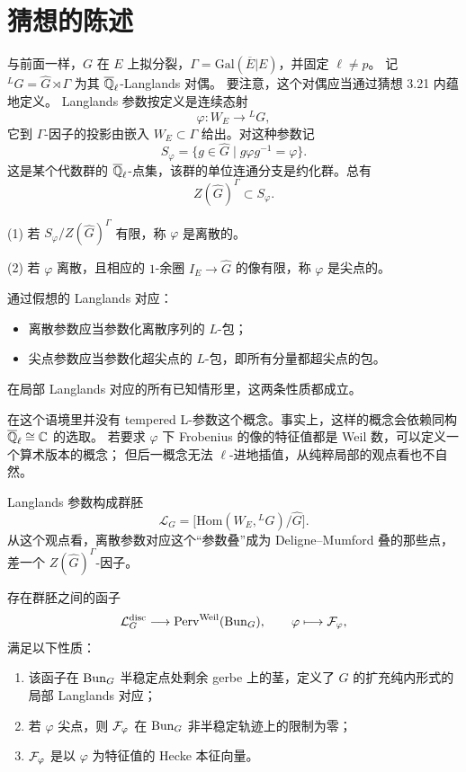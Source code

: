 \section{猜想的陈述}%

与前面一样，$G$ 在 $E$ 上拟分裂，$\Gamma=\mathrm{Gal}(\overline{E}|E)$，并固定 $\ell\neq p$。
记 ${}^{L}G=\widehat{G}\rtimes\Gamma$ 为其 $\overline{\mathbb{Q}}_\ell$-Langlands 对偶。
要注意，这个对偶应当通过猜想 3.21 内蕴地定义。
Langlands 参数按定义是连续态射
\[
\varphi:W_E\longrightarrow{}^{L}G,
\]
它到 $\Gamma$-因子的投影由嵌入 $W_E\subset\Gamma$ 给出。对这种参数记
\[
S_\varphi=\{g\in\widehat{G}\mid g\varphi g^{-1}=\varphi\}.
\]
这是某个代数群的 $\overline{\mathbb{Q}}_\ell$-点集，该群的单位连通分支是约化群。总有
\[
Z(\widehat{G})^\Gamma\subset S_\varphi.
\]

\begin{definition}\label{def:4.1}
(1) 若 $S_\varphi/Z(\widehat{G})^\Gamma$ 有限，称 $\varphi$ 是离散的。

(2) 若 $\varphi$ 离散，且相应的 $1$-余圈 $I_E\to\widehat{G}$ 的像有限，称 $\varphi$ 是尖点的。
\end{definition}

通过假想的 Langlands 对应：
\begin{itemize}
\item 离散参数应当参数化离散序列的 $L$-包；
\item 尖点参数应当参数化超尖点的 $L$-包，即所有分量都超尖点的包。
\end{itemize}
在局部 Langlands 对应的所有已知情形里，这两条性质都成立。

\begin{remark}\label{rem:4.2}
在这个语境里并没有 tempered L-参数这个概念。事实上，这样的概念会依赖同构 $\overline{\mathbb{Q}}_\ell\cong\mathbb{C}$ 的选取。
若要求 $\varphi$ 下 Frobenius 的像的特征值都是 Weil 数，可以定义一个算术版本的概念；
但后一概念无法 $\ell$-进地插值，从纯粹局部的观点看也不自然。
\end{remark}

Langlands 参数构成群胚
\[
\mathcal{L}_G=\big[\mathrm{Hom}(W_E,{}^{L}G)/\widehat{G}\big].
\]
从这个观点看，离散参数对应这个“参数叠”成为 Deligne–Mumford 叠的那些点，差一个 $Z(\widehat{G})^\Gamma$-因子。

\begin{conjecture}[粗略版本]\label{conj:4.3}
存在群胚之间的函子
\[
\mathcal{L}_G^{\mathrm{disc}}\longrightarrow \mathrm{Perv}^{\mathrm{Weil}}(\mathrm{Bun}_G),\qquad
\varphi\longmapsto\mathcal{F}_\varphi,
\]
满足以下性质：
\begin{enumerate}[label=(\arabic*)]
\item 该函子在 $\mathrm{Bun}_G$ 半稳定点处剩余 gerbe 上的茎，定义了 $G$ 的扩充纯内形式的局部 Langlands 对应；
\item 若 $\varphi$ 尖点，则 $\mathcal{F}_\varphi$ 在 $\mathrm{Bun}_G$ 非半稳定轨迹上的限制为零；
\item $\mathcal{F}_\varphi$ 是以 $\varphi$ 为特征值的 Hecke 本征向量。
\end{enumerate}
\end{conjecture}

